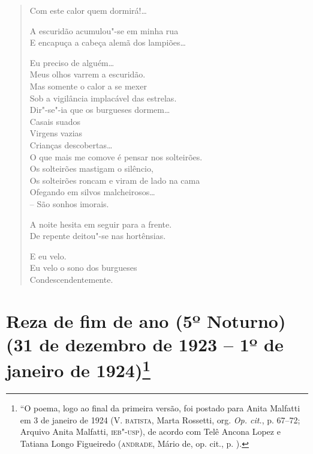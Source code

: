 \begin{verse}
Com este calor quem dormirá!\ldots{}

A escuridão acumulou"-se em minha rua\\
E encapuça a cabeça alemã dos lampiões\ldots{}

Eu preciso de alguém\ldots{}\\
Meus olhos varrem a escuridão.\\
Mas somente o calor a se mexer\\
Sob a vigilância implacável das estrelas.\\
Dir"-se"-ia que os burgueses dormem\ldots{}\\
\qquad\qquad\qquad Casais suados\\
\qquad\qquad\qquad Virgens vazias\\
\qquad\qquad\qquad Crianças descobertas\ldots{}\\
O que mais me comove é pensar nos solteirões.\\
Os solteirões mastigam o silêncio,\\
Os solteirões roncam e viram de lado na cama\\
Ofegando em silvos malcheirosos\ldots{}\\
\quad\qquad\qquad\qquad\qquad -- São sonhos imorais.

A noite hesita em seguir para a frente.\\
De repente deitou"-se nas hortênsias.

E eu velo.\\
Eu velo o sono dos burgueses\\
Condescendentemente.
\end{verse}

\pagebreak
\section[Reza de fim de ano (5º Noturno)]{Reza de fim de ano (5º Noturno)\break(31 de dezembro de 1923 -- 1º de janeiro de 1924)\footnote{``O poema, logo ao final da
  primeira versão, foi postado para Anita Malfatti em 3 de janeiro de
  1924 (V. \textsc{batista}, Marta Rossetti, org. \emph{Op. cit.}, p. 67--72;
  Arquivo Anita Malfatti, \textsc{ieb"-usp}), de acordo com Telê Ancona Lopez e
  Tatiana Longo Figueiredo (\textsc{andrade}, Mário de, op. cit., p. ).}}

